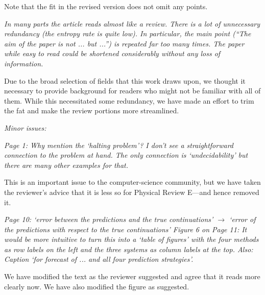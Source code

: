 \documentclass[12pt]{article}
\newcommand{\alert}[1]{{\color{red}#1}}
\begin{document}
Note that the fit in the revised version does not omit any points.

\smallskip

\emph{In many parts the article reads almost like a review. There is a
  lot of unnecessary redundancy (the entropy rate is quite low). In
  particular, the main point (``The aim of the paper is not ... but
  ...'') is repeated far too many times. The paper while easy to read
  could be shortened considerably without any loss of information.}

Due to the broad selection of fields that this work draws upon, we
thought it necessary to provide background for readers who might not
be familiar with all of them.  While this necessitated some
redundancy, we have made an effort to trim the fat and make the review
portions more streamlined.

\noindent\emph{Minor issues:}

\emph{Page 1: Why mention the `halting problem'? I don't see a
  straightforward connection to the problem at hand. The only
  connection is `undecidability' but there are many other examples for
  that.}

This is an important issue to the computer-science community, but we
have taken the reviewer's advice that it is less so for Physical
Review E---and hence removed it.


\smallskip

\emph{Page 10: `error between the predictions and the true continuations'
$\rightarrow$ `error of the predictions with respect to the true continuations'
Figure 6 on Page 11: It would be more intuitive to turn this into a `table of
figures' with the four methods as row labels on the left and the three systems
as column labels at the top. Also: Caption `for forecast of ... and all four
prediction strategies'.}

We have modified the text as the reviewer suggested and agree that it
reads more clearly now. We have also modified the figure as suggested.

\smallskip
\end{document}
